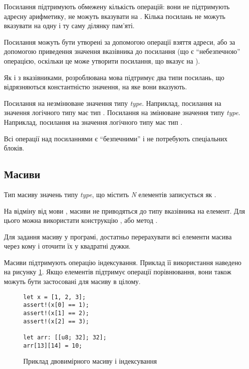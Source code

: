 \documentclass[main.tex]{subfiles}
\begin{document}
Посилання підтримують обмежену кількість операцій: вони не підтримують адресну арифметику, не можуть вказувати на . Кілька посилань не можуть вказувати на одну і ту саму ділянку пам'яті.

Посилання можуть бути утворені за допомогою операції взяття адреси, або за допомогою приведення значення вказівника до посилання (що є ``небезпечною'' операцією, оскільки це може утворити посилання, що вказує на ).

Як і з вказівниками, розроблювана мова підтримує два типи посилань, що відрязняються константністю значення, на яке вони вказують.
\begin{itemize}
Посилання на незмінюване значення типу \emph{type}.
Наприклад, посилання на значення логічного типу має тип .
Посилання на змінюване значення типу \emph{type}.
Наприклад, посилання на значення логічного типу має тип .
\end{itemize}

Всі операції над посиланнями є ``безпечними'' і не потребують спеціальних блоків.

\FloatBarrier
\subsection{Масиви}
Тип масиву значень типу \emph{type}, що містить \emph{N} елементів записується як .

На відміну від мови \LangC{}, масиви не приводяться до типу вказівника на елемент. Для цього можна використати конструкцію , або метод .

Для задання масиву у програмі, достатньо перерахувати всі елементи масива через кому і оточити їх у квадратні дужки.

Масиви підтримують операцію індексування. Приклад її використання наведено на рисунку \ref{lang:array:access}. Якщо елементів підтримує операції порівнювання, вони також можуть бути застосовані для масиву в цілому.

\begin{figure}[h]
  \centering
  \begin{verbatim}
let x = [1, 2, 3];
assert!(x[0] == 1);
assert!(x[1] == 2);
assert!(x[2] == 3);

let arr: [[u8; 32]; 32];
arr[13][14] = 10;
  \end{verbatim}
  \caption{Приклад двовимірного масиву і індексування}
  \label{lang:array:access}
\end{figure}
\end{document}
